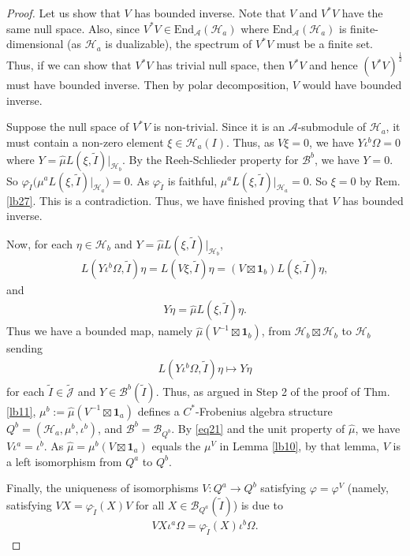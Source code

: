 \documentclass[11pt,b5paper,notitlepage]{article}
\theoremstyle{definition}
\theoremstyle{plain}
\newcommand{\mc}{\mathcal}
\newcommand{\wtd}{\widetilde}
\newcommand{\wht}{\widehat}
\newcommand{\End}{\mathrm{End}} %
\newcommand{\id}{\mathbf{1}}
\newcommand{\Jtd}{\widetilde{\mathcal J}}
\numberwithin{equation}{section}
\begin{document}
\begin{proof}
Let us show that $V$ has bounded inverse. Note that $V$ and $V^*V$ have the same null space. Also, since $V^*V\in\End_{\mc A}(\mc H_a)$ where $\End_{\mc A}(\mc H_a)$ is finite-dimensional (as $\mc H_a$ is dualizable), the spectrum of $V^*V$ must be a finite set. Thus, if we can show that $V^*V$ has trivial null space, then $V^*V$ and hence $(V^*V)^{\frac 12}$ must have bounded inverse. Then by polar decomposition, $V$ would have bounded inverse.

Suppose the null space of $V^*V$ is non-trivial. Since it is an $\mc A$-submodule of $\mc H_a$,  it must contain a non-zero element $\xi\in\mc H_a(I)$. Thus, as $V\xi=0$, we have $Y\iota^b\Omega=0$ where $Y=\wht\mu L(\xi,\wtd I)|_{\mc H_b}$. By the Reeh-Schlieder property for $\mc B^b$, we have $Y=0$. So $\varphi_{\wtd I}\big(\mu^aL(\xi,\wtd I)|_{\mc H_a}\big)=0$. As $\varphi_{\wtd I}$ is faithful, $\mu^a L(\xi,\wtd I)|_{\mc H_a}=0$. So $\xi=0$ by Rem. \ref{lb27}. This is a contradiction. Thus, we have finished proving that $V$ has bounded inverse.

Now, for each $\eta\in\mc H_b$ and $Y=\wht\mu L(\xi,\wtd I)|_{\mc H_b}$,
\begin{align*}
L(Y\iota^b\Omega,\wtd I)\eta=L(V\xi,\wtd I)\eta=(V\boxtimes\id_b)L(\xi,\wtd I)\eta,
\end{align*}
and
\begin{align*}
Y\eta=\wht\mu L(\xi,\wtd I)\eta.	
\end{align*}
Thus we have a bounded map, namely $\wht\mu(V^{-1}\boxtimes\id_b)$, from $\mc H_b\boxtimes\mc H_b$ to $\mc H_b$ sending
\begin{align*}
L(Y\iota^b\Omega,\wtd I)\eta\mapsto Y\eta
\end{align*}
for each $\wtd I\in\Jtd$ and $Y\in\mc B^b(\wtd I)$. Thus, as argued in Step 2 of the proof of Thm. \ref{lb11}, $\mu^b:=\wht\mu(V^{-1}\boxtimes\id_a)$ defines a $C^*$-Frobenius algebra structure $Q^b=(\mc H_a,\mu^b,\iota^b)$, and $\mc B^b=\mc B_{Q^b}$. By \eqref{eq21} and the unit property of $\wht\mu$, we have $V\iota^a=\iota^b$. As $\wht\mu=\mu^b(V\boxtimes\id_a)$ equals the $\mu^V$ in Lemma \ref{lb10}, by that lemma, $V$ is a left isomorphism from $Q^a$ to $Q^b$. 

Finally, the uniqueness of isomorphisms $V:Q^a\rightarrow Q^b$ satisfying $\varphi=\varphi^V$ (namely, satisfying $VX=\varphi_{\wtd I}(X)V$ for all $X\in\mc B_{Q^a}(\wtd I)$) is due to
\begin{align}
VX\iota^a\Omega=\varphi_{\wtd I}(X)\iota^b\Omega.
\end{align}
\end{proof}
\end{document}
